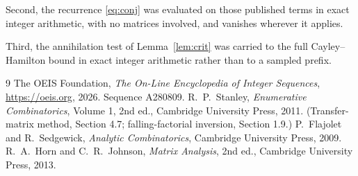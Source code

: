 \documentclass[11pt,a4paper]{article}
\theoremstyle{plain}
\theoremstyle{definition}
\begin{document}
Second, the recurrence \eqref{eq:conj} was evaluated on those published terms in exact
integer arithmetic, with no matrices involved, and vanishes wherever it applies.

Third, the annihilation test of Lemma~\ref{lem:crit} was carried to the full
Cayley--Hamilton bound in exact integer arithmetic rather than to a sampled prefix.

\begin{thebibliography}{9}
 The OEIS Foundation, \emph{The On-Line Encyclopedia of Integer
Sequences}, \url{https://oeis.org}, 2026. Sequence A280809.
 R.~P.~Stanley, \emph{Enumerative Combinatorics}, Volume 1, 2nd ed.,
Cambridge University Press, 2011. (Transfer-matrix method, Section 4.7; falling-factorial
inversion, Section 1.9.)
 P.~Flajolet and R.~Sedgewick, \emph{Analytic Combinatorics}, Cambridge
University Press, 2009.
 R.~A.~Horn and C.~R.~Johnson, \emph{Matrix Analysis}, 2nd ed., Cambridge
University Press, 2013.
\end{thebibliography}
\end{document}
